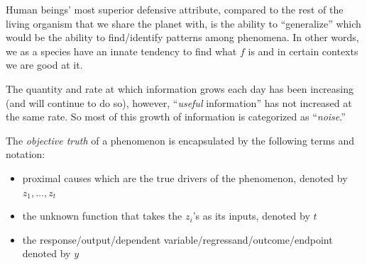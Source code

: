 \documentclass[12pt]{article}
\begin{document}
\begin{enumerate}
\begin{tcolorbox}[colback=white, sharp corners]

Human beings' most superior defensive attribute, compared to the rest of the living organism that we share the planet with, is the ability to ``generalize'' which would be the ability to find/identify patterns among phenomena. In other words, we as a species have an innate tendency to find what $f$ is and in certain contexts we are good at it. 

\end{tcolorbox}


\begin{tcolorbox}[colback=white, sharp corners]

The quantity and rate at which information grows each day has been increasing (and will continue to do so), however, ``\emph{useful} information'' has not increased at the same rate. So most of this growth of information is categorized as ``\emph{noise}.''

\end{tcolorbox}


\begin{tcolorbox}[colback=white, sharp corners]

The \emph{objective truth} of a phenomenon is encapsulated by the following terms and notation:

\begin{itemize}
\item proximal causes which are the true drivers of the phenomenon, denoted by $z_1, \ldots, z_t$
\item the unknown function that takes the $z_i$'s as its inputs, denoted by $t$
\item the response/output/dependent variable/regressand/outcome/endpoint denoted by $y$
\end{itemize}


\end{tcolorbox}
\end{enumerate}
\end{document}

